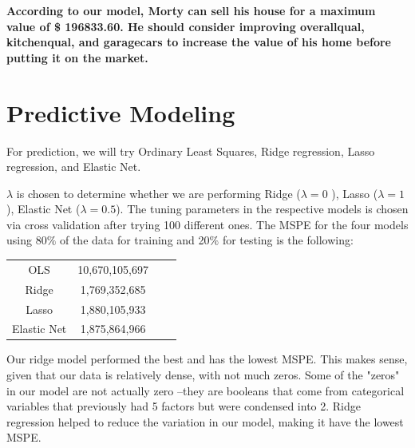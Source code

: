 \documentclass[12pt]{article}
\begin{document}
\begin{flushleft}
\begin{flushleft}
\begin{flushleft}
\begin{flushleft}
\textbf{According to our model, Morty can sell his house for a maximum value of \$ 196833.60. He should consider improving overallqual, kitchenqual, and garagecars to increase the value of his home before putting it on the market.}

\end{flushleft}



\end{flushleft}

\section{Predictive Modeling}

\begin{flushleft}

For prediction, we will try Ordinary Least Squares, Ridge regression, Lasso regression, and Elastic Net. 

\begin{flushleft}

$\lambda$ is chosen to determine whether we are performing Ridge ($\lambda = 0$ ), Lasso ($\lambda = 1$), Elastic Net ($\lambda = 0.5$). The tuning parameters in the respective models is chosen via cross validation after trying 100 different ones. The MSPE for the four models using 80$\%$ of the data for training and 20$\%$ for testing is the following:
\end{flushleft}
\centering
\begin{tabular}{ |c|c|c|c|}
\hline
OLS & 10,670,105,697 \\
Ridge & 1,769,352,685 \\
Lasso & 1,880,105,933 \\
Elastic Net & 1,875,864,966 \\
\hline
\end{tabular}
\begin{flushleft}

Our ridge model performed the best and has the lowest MSPE. This makes sense, given that our data is relatively dense, with not much zeros. Some of the "zeros" in our model are not actually zero --they are booleans that come from categorical variables that previously had 5 factors but were condensed into 2. Ridge regression helped to reduce the variation in our model, making it have the lowest MSPE.


\end{flushleft}
\end{flushleft}
\end{flushleft}
\end{flushleft}
\end{document}
